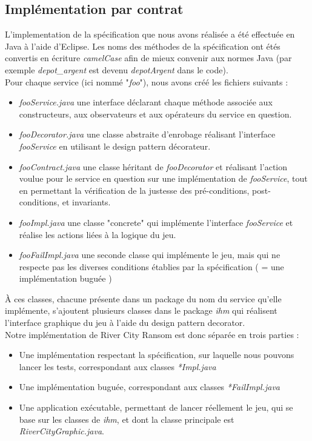 \documentclass[a4paper, 11pt, notitlepage]{article}
\begin{document}
\subsection{Implémentation par contrat}

L'implementation de la spécification que nous avons réalisée a été effectuée en Java à l'aide d'Eclipse. Les noms des méthodes de la spécification ont étés convertis en écriture \emph{camelCase} afin de mieux convenir aux normes Java (par exemple \emph{depot\_argent} est devenu \emph{depotArgent} dans le code). \\

Pour chaque service (ici nommé "\emph{foo}"), nous avons créé les fichiers suivants :  \\

\begin{itemize}
\item \emph{fooService.java}  une interface déclarant chaque méthode associée aux constructeurs, aux observateurs et aux opérateurs du service en question.  \\
\item \emph{fooDecorator.java}  une classe abstraite d'enrobage réalisant l'interface \emph{fooService} en utilisant le design pattern décorateur.\\
\item \emph{fooContract.java}  une classe héritant de \emph{fooDecorator} et réalisant l'action voulue pour le service en question sur une implémentation de \emph{fooService}, tout en permettant la vérification de la justesse des pré-conditions, post-conditions, et invariants.  \\
\item \emph{fooImpl.java}  une classe "concrete" qui implémente l'interface \emph{fooService} et réalise les actions liées à la logique du jeu. \\
\item \emph{fooFailImpl.java}  une seconde classe qui implémente le jeu, mais qui ne respecte pas les diverses conditions établies par la spécification ( = une implémentation buguée ) \\
\end{itemize}

À ces classes, chacune présente dans un package du nom du service qu'elle implémente, s'ajoutent plusieurs classes dans le package \emph{ihm} qui réalisent l'interface graphique du jeu à l'aide du design pattern decorator. \\

Notre implémentation de River City Ransom est donc séparée en trois parties : 
\begin{itemize}
\item Une implémentation respectant la spécification, sur laquelle nous pouvons lancer les tests, correspondant aux classes \emph{*Impl.java}
\item Une implémentation buguée, correspondant aux classes \emph{*FailImpl.java}
\item Une application exécutable, permettant de lancer réellement le jeu, qui se base sur les classes de \emph{ihm}, et dont la classe principale est \emph{RiverCityGraphic.java}. \\
\end{itemize}
\end{document}
